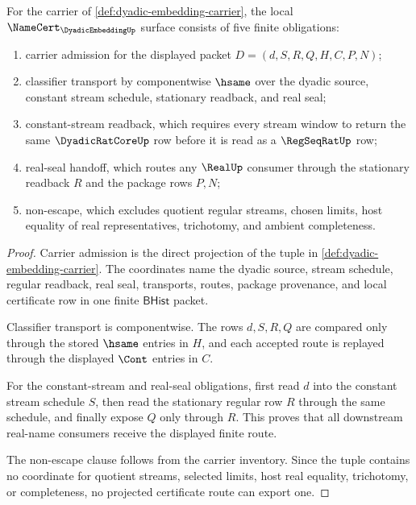 \begin{theorem}
\label{thm:dyadic-embedding-namecert-obligations}
For the carrier of \autoref{def:dyadic-embedding-carrier}, the local $\NameCert_{\DyadicEmbeddingUp}$ surface consists of five finite obligations:
\begin{enumerate}
\item carrier admission for the displayed packet $D=(d,S,R,Q,H,C,P,N)$;
\item classifier transport by componentwise $\hsame$ over the dyadic source, constant stream schedule, stationary readback, and real seal;
\item constant-stream readback, which requires every stream window to return the same $\DyadicRatCoreUp$ row before it is read as a $\RegSeqRatUp$ row;
\item real-seal handoff, which routes any $\RealUp$ consumer through the stationary readback $R$ and the package rows $P,N$;
\item non-escape, which excludes quotient regular streams, chosen limits, host equality of real representatives, trichotomy, and ambient completeness.
\end{enumerate}
\end{theorem}
\begin{proof}
Carrier admission is the direct projection of the tuple in \autoref{def:dyadic-embedding-carrier}. The coordinates name the dyadic source, stream schedule, regular readback, real seal, transports, routes, package provenance, and local certificate row in one finite $\mathsf{BHist}$ packet.

Classifier transport is componentwise. The rows $d,S,R,Q$ are compared only through the stored $\hsame$ entries in $H$, and each accepted route is replayed through the displayed $\Cont$ entries in $C$.

For the constant-stream and real-seal obligations, first read $d$ into the constant stream schedule $S$, then read the stationary regular row $R$ through the same schedule, and finally expose $Q$ only through $R$. This proves that all downstream real-name consumers receive the displayed finite route.

The non-escape clause follows from the carrier inventory. Since the tuple contains no coordinate for quotient streams, selected limits, host real equality, trichotomy, or completeness, no projected certificate route can export one.
\end{proof}

